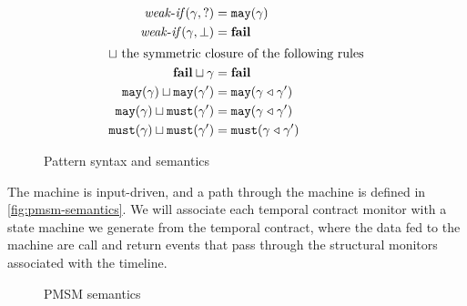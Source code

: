 \documentclass[preprint,onecolumn,9pt]{sigplanconf} %
\begin{document}
\begin{figure}
\begin{align*}
    \weakif(\mbindenv, ?) &= \smay{\mbindenv}
\\
    \weakif(\mbindenv, \bot) &= \mfail
\\[2pt]
    \sqcup\span \text{ the symmetric closure of the following rules}
\\
    \mfail \sqcup \mbindenv &= \mfail 
\\
    \smay{\mbindenv} \sqcup \smay{\mbindenv'} &= \smay{\combinef{\mbindenv}{\mbindenv'}}
\\
    \smay{\mbindenv} \sqcup \smust{\mbindenv'} &= \smay{\combinef{\mbindenv}{\mbindenv'}}
\\
    \smust{\mbindenv} \sqcup \smust{\mbindenv'} &= \smust{\combinef{\mbindenv}{\mbindenv'}}
  \end{align*}
  \caption{Pattern syntax and semantics}
  \label{fig:pattern-syntax}
\end{figure}

The machine is input-driven, and a path through the machine is defined in \autoref{fig:pmsm-semantics}.
%
We will associate each temporal contract monitor with a state machine we generate from the temporal contract, where the data fed to the machine are call and return events that pass through the structural monitors associated with the timeline.
%
\begin{figure}
  \begin{mathpar}
  \end{mathpar}
  \caption{PMSM semantics}
  \label{fig:pmsm-semantics}
\end{figure}
\end{document}
